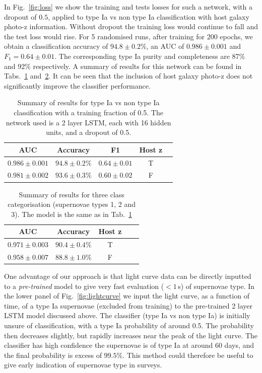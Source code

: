 \documentclass[nofootinbib,amsmath,amssymb,10pt,eqsecnum, twocolumn]{revtex4-1}
\begin{document}
In Fig.~\ref{fig:loss} we show the training and tests losses for such a network, with a dropout of $0.5$, applied to type Ia vs non type Ia classification with host galaxy photo-z information. Without dropout the training loss would continue to fall and the test loss would rise. For 5 randomised runs, after training for  200 epochs, we obtain a classification accuracy of $94.8 \pm 0.2$\%, an AUC of $0.986 \pm 0.001$ and $F_1 = 0.64 \pm 0.01$. The corresponding type Ia purity and completeness are 87\% and 92\% respectively. A summary of results for this network can be found in Tabs.~\ref{tab:05_SN1a} and~\ref{tab:05_123}. It can be seen that the inclusion of host galaxy photo-z does not significantly improve the classifier performance.  

\begin{table}[t!]
\begin{tabular}{|c | c | c | c | c |} \hline 
AUC & Accuracy & F1 & Host z \\ \hline 
$ 0.986 \pm  0.001$ &  $  94.8 \pm 0.2\% $ & $  0.64 \pm 0.01  $ & T  \\
$ 0.981 \pm  0.002$ &  $  93.6 \pm 0.3\% $ & $  0.60 \pm 0.02  $ & F  \\ \hline
\end{tabular}
\caption{\label{tab:05_SN1a} Summary of results for  type Ia vs non type Ia classification with a training fraction of 0.5. The network used is a 2 layer LSTM, each with 16 hidden units, and a dropout of 0.5.}
\end{table}

\begin{table}[t!]
\begin{tabular}{|c | c | c | c | c |} \hline 
AUC & Accuracy & Host z  \\ \hline 
$ 0.971  \pm 0.003 $ &  $  90.4  \pm 0.4 \% $ & T  \\
$ 0.958 \pm  0.007 $ &  $   88.8 \pm 1.0 \% $ & F \\ \hline
\end{tabular}
\caption{\label{tab:05_123} Summary of results for three class categorisation (supernovae types 1, 2 and 3). The model is the same as in Tab.~\ref{tab:05_SN1a}}
\end{table}

One advantage of our approach is that light curve data can be directly inputted to a {\em pre-trained} model to give very fast evaluation ($<1\,$s) of supernovae type. In the lower panel of Fig.~\ref{fig:lightcurve} we input the light curve, as a function of time, of a type Ia supernovae (excluded from training) to the pre-trained 2 layer LSTM model discussed above. The classifier (type Ia vs non type Ia) is initially unsure of classification, with a type Ia probability of around 0.5. The probability then decreases slightly, but rapidly increases near the peak of the light curve. The classifier has high confidence the supernovae is of type Ia at around 60 days, and the final probability is excess of $99.5\%$.  This method could therefore be useful to give early indication of supernovae type in  surveys.
\end{document}
